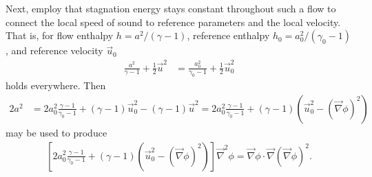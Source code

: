 \documentclass[letterpaper,11pt,nointlimits,reqno]{amsart}
\begin{document}
Next, \citeauthor{Saad2011Coordinate} employ that stagnation energy stays
constant throughout such a flow to connect the local speed of sound to
reference parameters and the local velocity.  That is, for flow enthalpy $h =
a^2 / \left(\gamma-1\right)$, reference enthalpy $h_0 = a_0^2 /
\left(\gamma_0-1\right)$, and reference velocity $\vec{u}_0$
\begin{align}
        \frac{a^2  }{\gamma  -1} + \frac{1}{2} \vec{u}^2
     &= \frac{a_0^2}{\gamma_0-1} + \frac{1}{2} \vec{u}_0^2
\end{align}
holds everywhere. Then
\begin{align}
        2a^2
     &=   2a_0^2 \frac{\gamma-1}{\gamma_0-1}
        + \left(\gamma-1\right)\vec{u}_0^2
        - \left(\gamma-1\right)\vec{u}^2
      =   2a_0^2 \frac{\gamma-1}{\gamma_0-1}
        + \left(\gamma-1\right)
          \left(\vec{u}_0^2 - \left(\vec{\nabla}\phi\right)^2\right)
\end{align}
may be used to produce
\begin{align}
    \left[
          2a_0^2 \frac{\gamma-1}{\gamma_0-1}
        + \left(\gamma-1\right)
          \left(\vec{u}_0^2 - \left(\vec{\nabla}\phi\right)^2\right)
    \right] \vec{\nabla}^2\phi
     = \vec{\nabla}\phi\cdot \vec{\nabla}\left(\vec{\nabla}\phi\right)^2
.
\end{align}


\newcommand*{\doi}[1]{\href{http://dx.doi.org/\detokenize{#1}}{doi: #1}}


\end{document}
